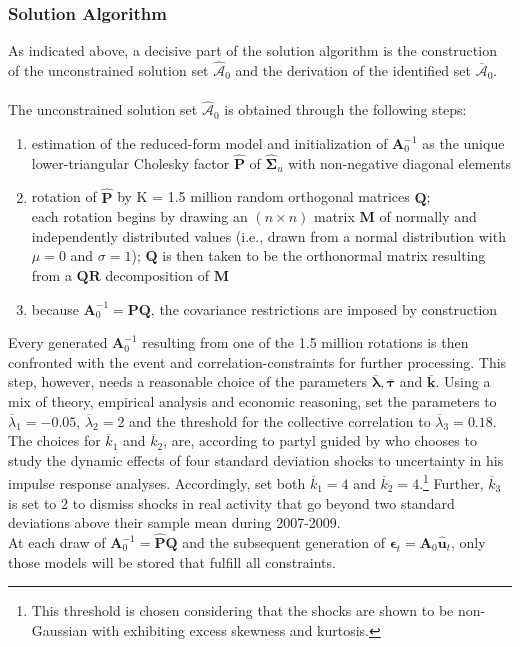 \documentclass[a4paper,11pt,listof=nochaptergap,oneside,pointednumbers,bibtotoc,bigheadings,liststotoc]{scrbook}
\theoremstyle{mysatz}
\theoremstyle{mydefinition}
\theoremstyle{mybemerkung}
\renewcommand*{\paragraph}[1]{\subsubsection*{#1} \vspace{-3mm}} %
\let\oldhat\hat
\newcommand{\vect}[1]{\boldsymbol{\mathbf{#1}}}
\newcommand{\hatt}[1]{\oldhat{\boldsymbol{\mathbf{#1}}}}
\begin{document}
\begin{itemize}
\paragraph{Solution Algorithm}
As indicated above, a decisive part of the solution algorithm is the construction of the unconstrained solution set $\hatt{\mathcal{A}}_0$ and the derivation of the identified set $\overline{\vect{\mathcal{A}}}_0$. \\
\\
The unconstrained solution set $\hatt{\mathcal{A}}_0$ is obtained through the following steps:
\begin{enumerate}[i]
	\item estimation of the reduced-form model and initialization of $\vect{A}_0^{-1}$ as the unique lower-triangular Cholesky factor $\hatt{\vect{P}}$ of $\hatt{\vect{\Sigma}}_u$ with non-negative diagonal elements
	\item rotation of $\hatt{\vect{P}}$ by K = 1.5 million random orthogonal matrices $\vect{Q}$;\\
	 each rotation begins by drawing an $(n \times n)$ matrix $\vect{M}$ of normally and independently distributed values (i.e., drawn from a normal distribution with $\mu = 0$ and $\sigma = 1$); $\vect{Q}$ is then taken to be the orthonormal matrix resulting from a $\vect{Q}\vect{R}$ decomposition of $\vect{M}$
	 \item because $\vect{A}_0^{-1} = \vect{P}\vect{Q}$, the covariance restrictions are imposed by construction 
\end{enumerate}

Every generated $\vect{A}_0^{-1}$ resulting from one of the 1.5 million rotations is then confronted with the event and correlation-constraints for further processing. This step, however, needs a reasonable choice of the parameters $\overline{\vect{\lambda}}, \overline{\vect{\tau}}$ and $\overline{\vect{k}}$. Using a mix of theory, empirical analysis and economic reasoning, \citet{ludvigsonetal:18} set the parameters to  $\overline{\lambda}_1 = -0.05$, $\overline{\lambda}_2 = 2$ and the threshold for the collective correlation to $\overline{\lambda}_3 = 0.18$. The choices for $\overline{k}_1$ and $\overline{k}_2$, are, according to \citet{ludvigsonetal:18} partyl guided by \citet{bloom:09} who chooses to study the dynamic effects of four standard deviation shocks to uncertainty in his impulse response analyses. Accordingly, \citet{ludvigsonetal:18} set both $\overline{k}_1 = 4$ and $\overline{k}_2 = 4$.\footnote{This threshold is chosen considering that the shocks are shown to be non-Gaussian with exhibiting excess skewness and kurtosis.} Further, $\overline{k}_3$ is set to 2 to dismiss shocks in real activity that go beyond two standard deviations above their sample mean during 2007-2009.
\\
At each draw of $\vect{A}_0^{-1} = \hatt{\vect{P}}\vect{Q}$ and the subsequent generation of $\vect{\epsilon}_t = \vect{A}_0\hatt{\vect{u}}_t$, only those models will be stored that fulfill all constraints.


\end{itemize}
\end{document}
